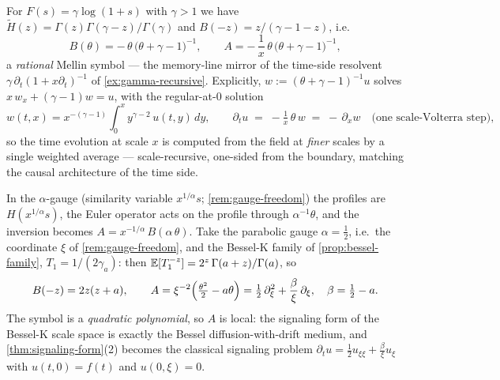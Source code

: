 \begin{example}\label{ex:gamma-signaling}
For $F(s) = \gamma \log(1+s)$ with $\gamma > 1$ we have
$\tilde H(z) = \Gamma(z)\Gamma(\gamma - z)/\Gamma(\gamma)$ and $B(-z) = z/(\gamma - 1 - z)$,
i.e.
\[
  B(\theta) = -\,\theta\,\bigl(\theta + \gamma - 1\bigr)^{-1},
  \qquad A = -\,\frac{1}{x}\,\theta\,\bigl(\theta + \gamma - 1\bigr)^{-1},
\]
a \emph{rational} Mellin symbol --- the memory-line mirror of the time-side resolvent
$\gamma\,\partial_t(1 + x\partial_t)^{-1}$ of \ref{ex:gamma-recursive}. Explicitly,
$w := (\theta + \gamma - 1)^{-1} u$ solves $x\,w_x + (\gamma-1)w = u$, with the regular-at-$0$
solution
\[
  w(t, x) = x^{-(\gamma-1)}\int_0^x y^{\gamma - 2}\, u(t, y)\,dy,
  \qquad
  \partial_t u \;=\; -\tfrac{1}{x}\,\theta\, w \;=\; -\,\partial_x w
  \quad\text{(one scale-Volterra step)},
\]
so the time evolution at scale $x$ is computed from the field at \emph{finer} scales by a
single weighted average --- scale-recursive, one-sided from the boundary, matching the causal
architecture of the time side.
\end{example}

\begin{example}\label{ex:bessel-quadratic}
In the $\alpha$-gauge (similarity variable $x^{1/\alpha} s$; \ref{rem:gauge-freedom}) the
profiles are $H(x^{1/\alpha}s)$, the Euler operator acts on the profile through
$\alpha^{-1}\theta$, and the inversion becomes $A = x^{-1/\alpha}\,B(\alpha\,\theta)$. Take the
parabolic gauge $\alpha = \tfrac12$, i.e.\ the coordinate $\xi$ of \ref{rem:gauge-freedom}, and
the Bessel-K family of \ref{prop:bessel-family}, $T_1 = 1/(2\gamma_a)$: then
$\mathbb{E}[T_1^{-z}] = 2^z\,\Gamma(a + z)/\Gamma(a)$, so
\[
  B(-z) = 2z(z + a), \qquad
  A = \xi^{-2}\Bigl(\tfrac{\theta^2}{2} - a\theta\Bigr)
  = \tfrac12\,\partial_\xi^2 + \frac{\beta}{\xi}\,\partial_\xi, \quad \beta = \tfrac12 - a .
\]
The symbol is a \emph{quadratic polynomial}, so $A$ is local: the signaling form of the
Bessel-K scale space is exactly the Bessel diffusion-with-drift medium, and
\ref{thm:signaling-form}(2) becomes the classical signaling problem
$\partial_t u = \tfrac12 u_{\xi\xi} + \tfrac{\beta}{\xi}u_\xi$ with $u(t,0) = f(t)$ and
$u(0,\xi) = 0$.
\end{example}

